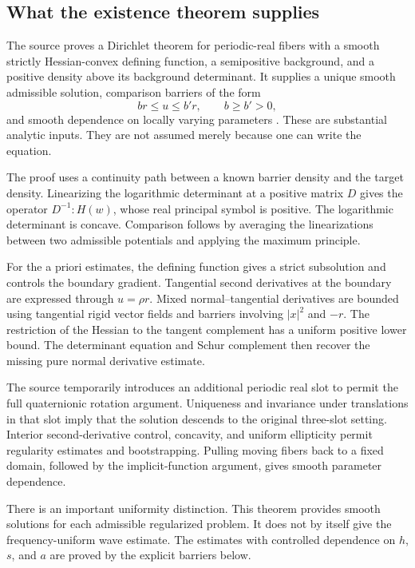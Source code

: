 \documentclass[11pt,a4paper]{article}
\numberwithin{equation}{section}
\theoremstyle{definition}
\theoremstyle{remark}
\begin{document}
\subsection{What the existence theorem supplies}
The source proves a Dirichlet theorem for periodic-real fibers with a smooth
strictly Hessian-convex defining function, a semipositive background, and a
positive density above its background determinant. It supplies a unique smooth
admissible solution, comparison barriers of the form
\[
 b r\le u\le b' r,\qquad b\ge b'>0,
\]
and smooth dependence on locally varying parameters \cite{dirichlet}.
These are substantial analytic inputs. They are not assumed merely because
one can write the equation.

The proof uses a continuity path between a known barrier density and the target
density. Linearizing the logarithmic determinant at a positive matrix $D$
gives the operator $D^{-1}:H(w)$, whose real principal symbol is positive.
The logarithmic determinant is concave. Comparison follows by averaging the
linearizations between two admissible potentials and applying the maximum
principle.

For the a priori estimates, the defining function gives a strict subsolution
and controls the boundary gradient. Tangential second derivatives at the
boundary are expressed through $u=\rho r$. Mixed normal--tangential derivatives
are bounded using tangential rigid vector fields and barriers involving
$|x|^2$ and $-r$. The restriction of the Hessian to the tangent complement has
a uniform positive lower bound. The determinant equation and Schur complement
then recover the missing pure normal derivative estimate.

The source temporarily introduces an additional periodic real slot to permit
the full quaternionic rotation argument. Uniqueness and invariance under
translations in that slot imply that the solution descends to the original
three-slot setting. Interior second-derivative control, concavity, and uniform
ellipticity permit regularity estimates and bootstrapping. Pulling moving
fibers back to a fixed domain, followed by the implicit-function argument,
gives smooth parameter dependence.

There is an important uniformity distinction. This theorem provides smooth
solutions for each admissible regularized problem. It does not by itself give
the frequency-uniform wave estimate. The estimates with controlled dependence
on $h$, $s$, and $a$ are proved by the explicit barriers below.
\end{document}
